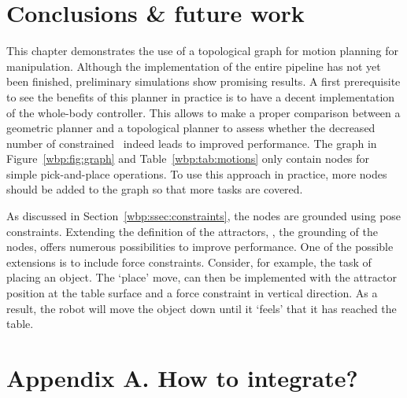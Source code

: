 \section{Conclusions \& future work}\label{wbp:sec:discussion}
This chapter demonstrates the use of a topological graph for motion planning for manipulation. Although the implementation of the entire pipeline has not yet been finished, preliminary simulations show promising results. 
A first prerequisite to see the benefits of this planner in practice is to have a decent implementation of the whole-body controller. This allows to make a proper comparison between a geometric planner and a topological planner to assess whether the decreased number of constrained \dofs\ indeed leads to improved performance.
The graph in Figure~\ref{wbp:fig:graph} and Table~\ref{wbp:tab:motions} only contain nodes for simple pick-and-place operations. 
To use this approach in practice, more nodes should be added to the graph so that more tasks are covered. 

As discussed in Section~\ref{wbp:ssec:constraints}, the nodes are grounded using pose constraints. 
Extending the definition of the attractors, \ie, the grounding of the nodes, offers numerous possibilities to improve performance. One of the possible extensions is to include force constraints.
Consider, for example, the task of placing an object. The `place' move, can then be implemented with the attractor position at the table surface and a force constraint in vertical direction. As a result, the robot will move the object down until it `feels' that it has reached the table. 

\newpage
\section{Appendix A. How to integrate?}

